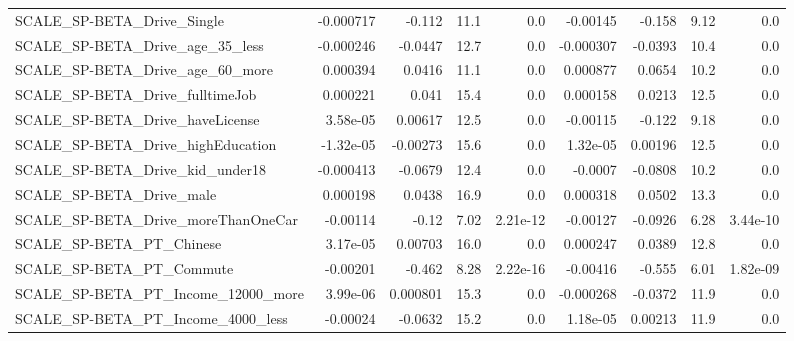 \begin{tabular}{lrrrrrrrr}
SCALE\_SP-BETA\_Drive\_Single                         &   -0.000717 &       -0.112 &     11.1 &      0.0 &   -0.00145 &      -0.158 &         9.12 &           0.0 \\
SCALE\_SP-BETA\_Drive\_age\_35\_less                    &   -0.000246 &      -0.0447 &     12.7 &      0.0 &  -0.000307 &     -0.0393 &         10.4 &           0.0 \\
SCALE\_SP-BETA\_Drive\_age\_60\_more                    &    0.000394 &       0.0416 &     11.1 &      0.0 &   0.000877 &      0.0654 &         10.2 &           0.0 \\
SCALE\_SP-BETA\_Drive\_fulltimeJob                    &    0.000221 &        0.041 &     15.4 &      0.0 &   0.000158 &      0.0213 &         12.5 &           0.0 \\
SCALE\_SP-BETA\_Drive\_haveLicense                    &    3.58e-05 &      0.00617 &     12.5 &      0.0 &   -0.00115 &      -0.122 &         9.18 &           0.0 \\
SCALE\_SP-BETA\_Drive\_highEducation                  &   -1.32e-05 &     -0.00273 &     15.6 &      0.0 &   1.32e-05 &     0.00196 &         12.5 &           0.0 \\
SCALE\_SP-BETA\_Drive\_kid\_under18                    &   -0.000413 &      -0.0679 &     12.4 &      0.0 &    -0.0007 &     -0.0808 &         10.2 &           0.0 \\
SCALE\_SP-BETA\_Drive\_male                           &    0.000198 &       0.0438 &     16.9 &      0.0 &   0.000318 &      0.0502 &         13.3 &           0.0 \\
SCALE\_SP-BETA\_Drive\_moreThanOneCar                 &    -0.00114 &        -0.12 &     7.02 & 2.21e-12 &   -0.00127 &     -0.0926 &         6.28 &      3.44e-10 \\
SCALE\_SP-BETA\_PT\_Chinese                           &    3.17e-05 &      0.00703 &     16.0 &      0.0 &   0.000247 &      0.0389 &         12.8 &           0.0 \\
SCALE\_SP-BETA\_PT\_Commute                           &    -0.00201 &       -0.462 &     8.28 & 2.22e-16 &   -0.00416 &      -0.555 &         6.01 &      1.82e-09 \\
SCALE\_SP-BETA\_PT\_Income\_12000\_more                 &    3.99e-06 &     0.000801 &     15.3 &      0.0 &  -0.000268 &     -0.0372 &         11.9 &           0.0 \\
SCALE\_SP-BETA\_PT\_Income\_4000\_less                  &    -0.00024 &      -0.0632 &     15.2 &      0.0 &   1.18e-05 &     0.00213 &         11.9 &           0.0 \\

\end{tabular}
